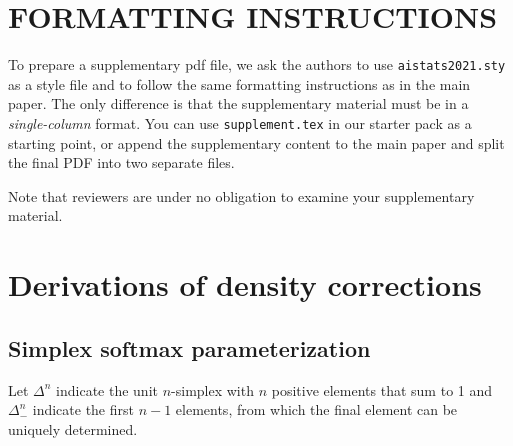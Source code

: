 \documentclass[twoside]{article}
\begin{document}
%

%

\onecolumn
{}

\section{FORMATTING INSTRUCTIONS}

To prepare a supplementary pdf file, we ask the authors to use \texttt{aistats2021.sty} as a style file and to follow the same formatting instructions as in the main paper.
The only difference is that the supplementary material must be in a \emph{single-column} format.
You can use \texttt{supplement.tex} in our starter pack as a starting point, or append the supplementary content to the main paper and split the final PDF into two separate files.

Note that reviewers are under no obligation to examine your supplementary material.

\section{Derivations of density corrections}

\subsection{Simplex softmax parameterization}

Let $\Delta^n$ indicate the unit $n$-simplex with $n$ positive elements that sum to 1 and $\Delta^n_-$ indicate the first $n-1$ elements, from which the final element can be uniquely determined.
\end{document}
